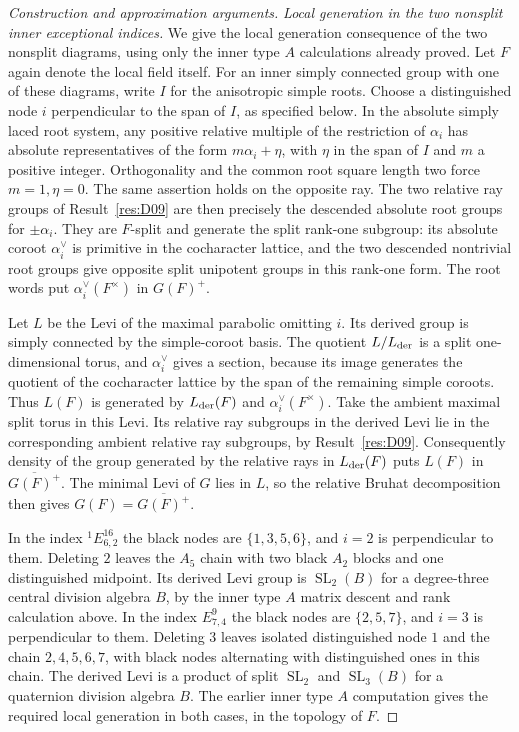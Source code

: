 \documentclass[11pt,a4paper,openany,oneside]{book}
\theoremstyle{resultstyle}
\theoremstyle{definition}
\numberwithin{equation}{chapter}
\begin{document}
\begin{proof}[Construction and approximation arguments]
\medskip\noindent
\textit{Local generation in the two nonsplit inner exceptional
indices.}
We give the local generation consequence of the two
nonsplit diagrams, using only the inner type \(A\)
calculations already proved. Let \(F\) again denote the
local field itself. For an inner simply connected group
with one of these diagrams, write \(I\) for the
anisotropic simple roots. Choose a distinguished node
\(i\) perpendicular to the span of \(I\), as specified
below. In the absolute simply laced root system, any
positive relative multiple of the restriction of
\(\alpha_i\) has absolute representatives of the form
\(m\alpha_i+\eta\), with \(\eta\) in the span of \(I\)
and \(m\) a positive integer. Orthogonality and the
common root square length two force \(m=1,\eta=0\).
The same assertion holds on the opposite ray. The
two relative ray groups of Result~\ref{res:D09} are
then precisely the descended absolute root groups for
\(\pm\alpha_i\). They are \(F\)-split and generate
the split rank-one subgroup: its absolute coroot
\(\alpha_i^\vee\) is primitive in the cocharacter lattice,
and the two descended nontrivial root groups give
opposite split unipotent groups in this rank-one form.
The root words put \(\alpha_i^\vee(F^\times)\) in \(G(F)^+\).

Let \(L\) be the Levi of the maximal parabolic omitting
\(i\). Its derived group is simply connected by the
simple-coroot basis. The quotient \(L/L_{\rm der}\)
is a split one-dimensional torus, and
\(\alpha_i^\vee\) gives a section, because its image
generates the quotient of the cocharacter lattice by
the span of the remaining simple coroots. Thus \(L(F)\)
is generated by \(L_{\rm der}(F)\) and
\(\alpha_i^\vee(F^\times)\). Take the ambient maximal
split torus in this Levi. Its relative ray subgroups
in the derived Levi lie in the corresponding ambient
relative ray subgroups, by Result~\ref{res:D09}.
Consequently density of the group generated by the
relative rays in \(L_{\rm der}(F)\) puts \(L(F)\) in
\(\overline{G(F)^+}\). The minimal Levi of \(G\) lies
in \(L\), so the relative Bruhat decomposition then
gives \(G(F)=\overline{G(F)^+}\).

In the index \(^{1}E_{6,2}^{16}\) the black nodes are
\(\{1,3,5,6\}\), and \(i=2\) is perpendicular to them.
Deleting \(2\) leaves the \(A_5\) chain with two black
\(A_2\) blocks and one distinguished midpoint. Its
derived Levi group is \(\operatorname{SL}_2(B)\) for a
degree-three central division algebra \(B\), by the
inner type \(A\) matrix descent and rank calculation
above. In the index \(E_{7,4}^{9}\) the black nodes are
\(\{2,5,7\}\), and \(i=3\) is perpendicular to them.
Deleting \(3\) leaves isolated distinguished node \(1\)
and the chain \(2,4,5,6,7\), with black nodes alternating
with distinguished ones in this chain. The derived
Levi is a product of split \(\operatorname{SL}_2\)
and \(\operatorname{SL}_3(B)\) for a quaternion
division algebra \(B\). The earlier inner type \(A\)
computation gives the required local generation in
both cases, in the topology of \(F\).


\end{proof}
\end{document}
